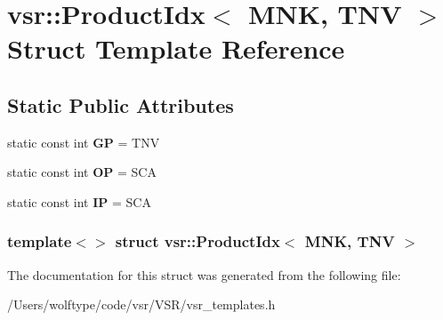 \hypertarget{structvsr_1_1_product_idx_3_01_m_n_k_00_01_t_n_v_01_4}{\section{vsr\-:\-:Product\-Idx$<$ M\-N\-K, T\-N\-V $>$ Struct Template Reference}
\label{structvsr_1_1_product_idx_3_01_m_n_k_00_01_t_n_v_01_4}
}
\subsection*{Static Public Attributes}
\begin{DoxyCompactItemize}
\item 
\hypertarget{structvsr_1_1_product_idx_3_01_m_n_k_00_01_t_n_v_01_4_adc4325730eadcdcac188338fe02d08b6}{static const int {\bfseries G\-P} = T\-N\-V}\label{structvsr_1_1_product_idx_3_01_m_n_k_00_01_t_n_v_01_4_adc4325730eadcdcac188338fe02d08b6}

\item 
\hypertarget{structvsr_1_1_product_idx_3_01_m_n_k_00_01_t_n_v_01_4_a476af8ecb9e2ebb939eeebd06927e9f0}{static const int {\bfseries O\-P} = S\-C\-A}\label{structvsr_1_1_product_idx_3_01_m_n_k_00_01_t_n_v_01_4_a476af8ecb9e2ebb939eeebd06927e9f0}

\item 
\hypertarget{structvsr_1_1_product_idx_3_01_m_n_k_00_01_t_n_v_01_4_ab9498f54fb5144a76ad0e8871fb525f5}{static const int {\bfseries I\-P} = S\-C\-A}\label{structvsr_1_1_product_idx_3_01_m_n_k_00_01_t_n_v_01_4_ab9498f54fb5144a76ad0e8871fb525f5}

\end{DoxyCompactItemize}
\subsubsection*{template$<$$>$ struct vsr\-::\-Product\-Idx$<$ M\-N\-K, T\-N\-V $>$}



The documentation for this struct was generated from the following file\-:\begin{DoxyCompactItemize}
\item 
/\-Users/wolftype/code/vsr/\-V\-S\-R/vsr\-\_\-templates.\-h\end{DoxyCompactItemize}
